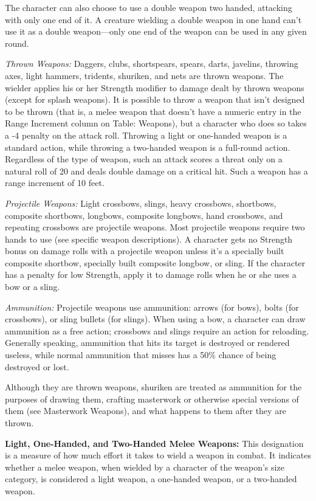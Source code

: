 The character can also choose to use a double weapon two handed, attacking with only one end of it. A creature wielding a double weapon in one hand can't use it as a double weapon—only one end of the weapon can be used in any given round.

\textit{Thrown Weapons:} Daggers, clubs, shortspears, spears, darts, javelins, throwing axes, light hammers, tridents, shuriken, and nets are thrown weapons. The wielder applies his or her Strength modifier to damage dealt by thrown weapons (except for splash weapons). It is possible to throw a weapon that isn't designed to be thrown (that is, a melee weapon that doesn't have a numeric entry in the Range Increment column on Table: Weapons), but a character who does so takes a -4 penalty on the attack roll. Throwing a light or one-handed weapon is a standard action, while throwing a two-handed weapon is a full-round action. Regardless of the type of weapon, such an attack scores a threat only on a natural roll of 20 and deals double damage on a critical hit. Such a weapon has a range increment of 10 feet.

\textit{Projectile Weapons:} Light crossbows, slings, heavy crossbows, shortbows, composite shortbows, longbows, composite longbows, hand crossbows, and repeating crossbows are projectile weapons. Most projectile weapons require two hands to use (see specific weapon descriptions). A character gets no Strength bonus on damage rolls with a projectile weapon unless it's a specially built composite shortbow, specially built composite longbow, or sling. If the character has a penalty for low Strength, apply it to damage rolls when he or she uses a bow or a sling.

\textit{Ammunition:} Projectile weapons use ammunition: arrows (for bows), bolts (for crossbows), or sling bullets (for slings). When using a bow, a character can draw ammunition as a free action; crossbows and slings require an action for reloading. Generally speaking, ammunition that hits its target is destroyed or rendered useless, while normal ammunition that misses has a 50\% chance of being destroyed or lost.

Although they are thrown weapons, shuriken are treated as ammunition for the purposes of drawing them, crafting masterwork or otherwise special versions of them (see Masterwork Weapons), and what happens to them after they are thrown.

\textbf{Light, One-Handed, and Two-Handed Melee Weapons:} This designation is a measure of how much effort it takes to wield a weapon in combat. It indicates whether a melee weapon, when wielded by a character of the weapon's size category, is considered a light weapon, a one-handed weapon, or a two-handed weapon.

